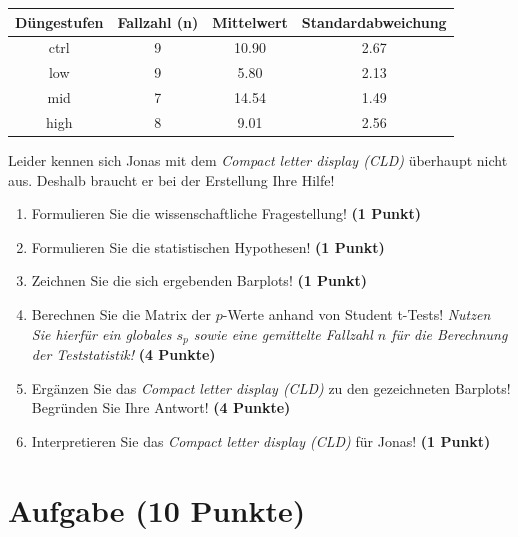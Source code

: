 \documentclass[a4paper, 9pt]{scrartcl}\usepackage[]{graphicx}\usepackage[]{xcolor}
\newenvironment{knitrout}{}{} %
\begin{document}
\begin{knitrout}
\color{fgcolor}\begin{table}[!h]
\centering\begingroup\fontsize{10}{12}\selectfont

\begin{tabular}{cccc}
\toprule
\textbf{Düngestufen} & \textbf{Fallzahl (n)} & \textbf{Mittelwert} & \textbf{Standardabweichung}\\
\midrule
ctrl & 9 & 10.90 & 2.67\\
low & 9 & 5.80 & 2.13\\
mid & 7 & 14.54 & 1.49\\
high & 8 & 9.01 & 2.56\\
\bottomrule
\end{tabular}
\endgroup{}
\end{table}

\end{knitrout}

Leider kennen sich Jonas mit dem \textit{Compact letter display (CLD)} überhaupt nicht aus. Deshalb braucht er bei der Erstellung Ihre Hilfe!

\begin{enumerate}
  \item Formulieren Sie die wissenschaftliche Fragestellung! \textbf{(1 Punkt)}
  \item Formulieren Sie die statistischen Hypothesen! \textbf{(1 Punkt)}
\item Zeichnen Sie die sich ergebenden Barplots! \textbf{(1 Punkt)}
\item Berechnen Sie die Matrix der $p$-Werte anhand von Student t-Tests! \textit{Nutzen Sie hierfür ein globales $s_p$ sowie eine gemittelte Fallzahl $n$ für die Berechnung der Teststatistik!} \textbf{(4 Punkte)}
\item Ergänzen Sie das \textit{Compact letter display (CLD)} zu den gezeichneten Barplots! Begründen Sie Ihre Antwort! \textbf{(4 Punkte)}
\item Interpretieren Sie das \textit{Compact letter display (CLD)} für Jonas! \textbf{(1 Punkt)} 
\end{enumerate}

 
\clearpage

\section{Aufgabe \hfill (10 Punkte)}
\end{document}

